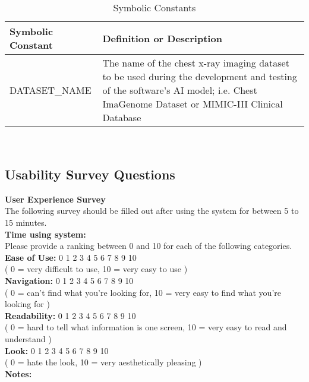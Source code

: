 \documentclass[12pt, titlepage]{article}
\begin{document}
\renewcommand{\arraystretch}{1.2}
\begin{table}[h]
    \centering
    \begin{tabular}{p{1.25in}p{3.75in}}
        \toprule
        \textbf{Symbolic Constant} & \textbf{Definition or Description} \\
        \midrule
        DATASET\_NAME & The name of the chest x-ray imaging dataset to be used during the development and testing of the software's AI model; i.e. Chest ImaGenome Dataset or MIMIC-III Clinical Database \\
        \bottomrule
    \end{tabular}\\
    \caption{Symbolic Constants}
    \label{tab:symbolicConstants}
\end{table}

\subsection{Usability Survey Questions} \hypertarget{UsabilityS}{}
\begin{mdframed}[linewidth=0.5mm]
  \textbf{User Experience Survey} \\
  The following survey should be filled out after using the system for between 5 to 15 minutes.\\
  
  \textbf{Time using system:} \\

  Please provide a ranking between 0 and 10 for each of the following categories.\\
  
  \textbf{Ease of Use:} 0 1  2  3  4  5  6  7  8  9  10 \\
  ( 0 = very difficult to use, 10 = very easy to use ) \\
  
  \textbf{Navigation:} 0  1  2  3  4  5  6  7  8  9  10 \\
  ( 0 = can't find what you're looking for, 10 = very easy to find what you're looking for ) \\
  
  \textbf{Readability:} 0  1  2  3  4  5  6  7  8  9  10 \\
  ( 0 = hard to tell what information is one screen, 10 = very easy to read and understand ) \\

  \textbf{Look:} 0  1  2  3  4  5  6  7  8  9  10 \\
  ( 0 = hate the look, 10 = very aesthetically pleasing ) \\
  
  \textbf{Notes:} 
\end{mdframed}
\end{document}
